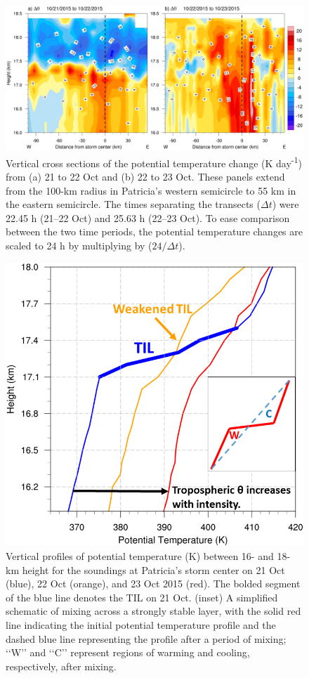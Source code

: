 \begin{figure}[ht]
\centerline{\includegraphics[width=39pc]{figures/fig06_deltatheta.png}}
\caption{Vertical cross sections of the potential temperature change (K day\textsuperscript{-1}) from (a) 21 to 22 Oct and (b) 22 to 23 Oct. These panels extend from the 100-km radius in Patricia’s western semicircle to 55 km in the eastern semicircle. The times separating the transects ($\Delta t$) were 22.45 h (21–22 Oct) and 25.63 h (22–23 Oct). To ease comparison between the two time periods, the potential temperature changes are scaled to 24 h by multiplying by ($24/\Delta t$).}
\label{fig:dtheta}
\end{figure}

\begin{figure}[ht]
\centerline{\includegraphics[width=33pc]{figures/fig07_schematic.png}}
\caption{Vertical profiles of potential temperature (K) between 16- and 18-km height for the soundings at Patricia’s storm center on 21 Oct (blue), 22 Oct (orange), and 23 Oct 2015 (red). The bolded segment of the blue line denotes the TIL on 21 Oct. (inset) A simplified schematic of mixing across a strongly stable layer, with the solid red line indicating the initial potential temperature profile and the dashed blue line representing the profile after a period of mixing; ‘‘W’’ and ‘‘C’’ represent regions of warming and cooling, respectively, after mixing.}
\label{fig:schematic}
\end{figure}


